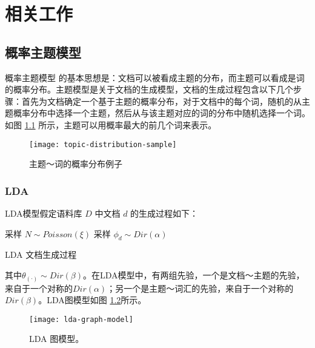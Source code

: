 \chapter{相关工作}

\section{概率主题模型}
概率主题模型 \cite{griffiths2004finding, Blei:2003, hofmann1999probabilistic, hofmann2001unsupervised} 的基本思想是：文档可以被看成主题的分布，而主题可以看成是词的概率分布。主题模型是关于文档的生成模型，文档的生成过程包含以下几个步骤：首先为文档确定一个基于主题的概率分布，对于文档中的每个词，随机的从主题概率分布中选择一个主题，然后从与该主题对应的词的分布中随机选择一个词。如图 \ref{fig:topic-distribution-sample} 所示，主题可以用概率最大的前几个词来表示。
\begin{figure}[htb]
    \centering%
    \texttt{[image: topic-distribution-sample]}
    \caption{主题～词的概率分布例子}
    \label{fig:topic-distribution-sample}
\end{figure}

\subsection{LDA}
\label{intro-lda}
LDA\cite{Blei:2003}模型假定语料库 $D$ 中文档 $d$ 的生成过程如下：\\
\begin{algorithm}[!htb]
  采样 $N \sim Poisson(\xi)$\;
  采样 $\phi_d \sim Dir(\alpha)$\;
  \caption{LDA 文档生成过程}
  \label{lda-generative-process}
\end{algorithm}

其中$\theta_{(\cdot)} \sim Dir(\beta)$。在LDA模型中，有两组先验，一个是文档～主题的先验，来自于一个对称的$Dir(\alpha)$；另一个是主题～词汇的先验，来自于一个对称的$Dir(\beta)$。LDA图模型如图 \ref{fig:lda-graph-model}所示。
\begin{figure}[htb]
    \centering%
    \texttt{[image: lda-graph-model]}
    \caption{LDA 图模型。}
    \label{fig:lda-graph-model}
\end{figure}

